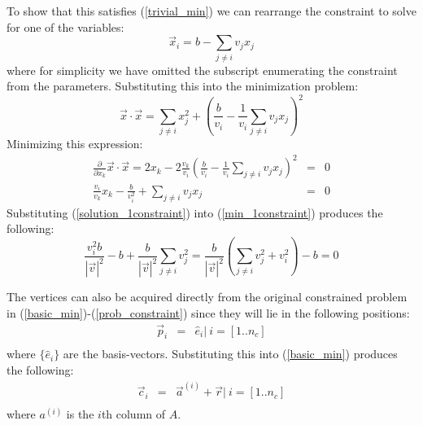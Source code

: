 \documentclass{article}
\begin{document}
To show that this satisfies (\ref{trivial_min}) we can rearrange the constraint
to solve for one of the variables:
\begin{equation}
	\vec x_i = b - \sum_{j \ne i} v_j x_j
\end{equation}
where for simplicity we have omitted the subscript enumerating the constraint
from the parameters.
Substituting this into the minimization problem:
\begin{equation}
	\vec x \cdot \vec x = \sum_{j \ne i} x_j^2 + 
	\left (\frac{b}{v_i} - \frac{1}{v_i} \sum_{j \ne i} v_j x_j \right )^2
\end{equation}
Minimizing this expression:
\begin{eqnarray}
	\frac{\partial}{\partial x_k} \vec x \cdot \vec x = 2 x_k - 2 \frac{v_k}{v_i} \left (\frac{b}{v_i} - \frac{1}{v_i} \sum_{j \ne i} v_j x_j \right )^2 
	& = & 0 \\
	\frac{v_i}{v_k} x_k - \frac{b}{v_i^2} + \sum_{j \ne i} v_j x_j & = & 0
	\label{min_1constraint}
\end{eqnarray}
Substituting (\ref{solution_1constraint}) into (\ref{min_1constraint})
produces the following:
\begin{equation}
	\frac{v_i^2 b}{|\vec v|^2} - b + \frac{b}{|\vec v|^2} \sum_{j \ne i} v_j^2 
    = \frac{b}{|\vec v|^2} \left (\sum_{j \ne i} v_j^2 + v_i^2 \right ) - b = 0
\end{equation}

The vertices can also be acquired directly from the original constrained
problem in (\ref{basic_min})-(\ref{prob_constraint})
since they will lie in the following positions:
\begin{eqnarray}
	\vec p_i & = & \hat e_i | ~ i=[1..n_c] \\
\end{eqnarray}
where $\lbrace \hat e_i \rbrace$ are the basis-vectors.
Substituting this into (\ref{basic_min}) produces the following:
\begin{eqnarray}
	\vec c_i & = & \vec a^{(i)} + \vec r | ~ i=[1..n_c] \label{vertex_i}\\
\end{eqnarray}
where $a^{(i)}$ is the $i$th column of $A$.
\end{document}
